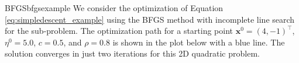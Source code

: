 \begin{example}{BFGS}{bfgsexample}
    We consider the optimization of Equation \eqref{eq:simpledescent_example} using the BFGS method with incomplete line search for the sub-problem. The optimization path for a starting point $\mathbf{x}^0= (4, -1)^\top$, $\eta^0=5.0$, $c=0.5$, and $\rho=0.8$ is shown in the plot below with a blue line. The solution converges in just two iterations for this 2D quadratic problem.
    \begin{center}
        
    \end{center}   
\end{example}



 


